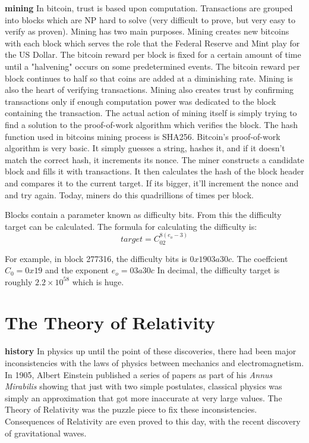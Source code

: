 \documentclass[conference]{IEEEtran}
\begin{document}
\textbf{mining} In bitcoin, trust is based upon computation. Transactions are grouped into blocks which are NP hard to solve (very difficult to prove, but very easy to verify as proven). Mining has two main purposes. Mining creates new bitcoins with each block which serves the role that the Federal Reserve and Mint play for the US Dollar. The bitcoin reward per block is fixed for a certain amount of time until a "halvening" occurs on some predetermined events. The bitcoin reward per block continues to half so that coins are added at a diminishing rate. Mining is also the heart of verifying transactions. Mining also creates trust by confirming transactions only if enough computation power was dedicated to the block containing the transaction. The actual action of mining itself is simply trying to find a solution to the proof-of-work algorithm which verifies the block. The hash function used in bitcoins mining process is SHA256. Bitcoin's proof-of-work algorithm is very basic. It simply guesses a string, hashes it, and if it doesn't match the correct hash, it increments its nonce. The miner constructs a candidate block and fills it with transactions. It then calculates the hash of the block header and compares it to the current target. If its bigger, it’ll increment the nonce and and try again. Today, miners do this quadrillions of times per block. \cite{hashcash}

Blocks contain a parameter known as difficulty bits. From this the difficulty target can be calculated. The formula for calculating the difficulty is: 
\begin{equation}
target = C_02^{8(e_o - 3)}
\end{equation}

For example, in block 277316, the difficulty bits is $0x1903a30c$. The coeffcient $C_0 = 0x19$ and the exponent $e_o = 03a30c$ In decimal, the difficulty target is roughly $2.2 \times 10^{58}$ which is huge. \cite{bitcoincore}

\section{The Theory of Relativity}
\textbf{history} In physics up until the point of these discoveries, there had been major inconsistencies with the laws of physics between mechanics and electromagnetism. In 1905, Albert Einstein published a series of papers as part of his \textit{Annus Mirabilis} showing that just with two simple postulates, classical physics was simply an approximation that got more inaccurate at very large values. The Theory of Relativity was the puzzle piece to fix these inconsistencies. Consequences of Relativity are even proved to this day, with the recent discovery of gravitational waves. \cite{history,waves}
\end{document}
